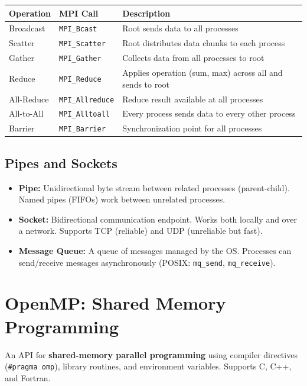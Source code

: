 \documentclass[11pt,a4paper]{article}
\begin{document}
\begin{longtable}{@{}p{3.5cm}p{4cm}p{6.5cm}@{}}
\toprule
\rowcolor{primary!15}
\textbf{Operation} & \textbf{MPI Call} & \textbf{Description} \\
\midrule
\endhead
Broadcast & \texttt{MPI\_Bcast} & Root sends data to all processes \\
Scatter & \texttt{MPI\_Scatter} & Root distributes data chunks to each process \\
Gather & \texttt{MPI\_Gather} & Collects data from all processes to root \\
Reduce & \texttt{MPI\_Reduce} & Applies operation (sum, max) across all and sends to root \\
All-Reduce & \texttt{MPI\_Allreduce} & Reduce result available at all processes \\
All-to-All & \texttt{MPI\_Alltoall} & Every process sends data to every other process \\
Barrier & \texttt{MPI\_Barrier} & Synchronization point for all processes \\
\bottomrule
\end{longtable}

\subsection{Pipes and Sockets}
\begin{itemize}[leftmargin=*, itemsep=3pt]
  \item \textbf{Pipe:} Unidirectional byte stream between related processes (parent-child). Named pipes (FIFOs) work between unrelated processes.
  \item \textbf{Socket:} Bidirectional communication endpoint. Works both locally and over a network. Supports TCP (reliable) and UDP (unreliable but fast).
  \item \textbf{Message Queue:} A queue of messages managed by the OS. Processes can send/receive messages asynchronously (POSIX: \texttt{mq\_send}, \texttt{mq\_receive}).
\end{itemize}

\section{OpenMP: Shared Memory Programming}

\begin{conceptbox}[OpenMP]
An API for \textbf{shared-memory parallel programming} using compiler directives (\texttt{\#pragma omp}), library routines, and environment variables. Supports C, C++, and Fortran.
\end{conceptbox}
\end{document}
